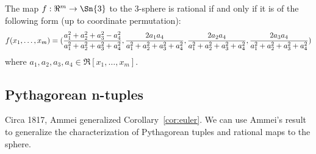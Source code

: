 \documentclass[11pt]{article}
\begin{document}
\begin{corollary}
\label{thm:map4}
The map $f: \Re^m \rightarrow \Sn{3}$ to the 3-sphere is rational if and only if
it is of the following form (up to coordinate permutation):
\begin{equation}
\label{eq:re4s3}
f(x_1,\ldots,x_m) = 
\footnotesize{(\frac{a_1^2 + a_2^2 + a_3^2 - a_4^2}{a_1^2 + a_2^2 + a_3^2 + a_4^2},
	 \frac{2a_1a_4}{a_1^2 + a_2^2 + a_3^2 + a_4^2},
	 \frac{2a_2a_4}{a_1^2 + a_2^2 + a_3^2 + a_4^2},
	 \frac{2a_3a_4}{a_1^2 + a_2^2 + a_3^2 + a_4^2})}
\end{equation}
where $a_1,a_2,a_3,a_4 \in \Re[x_1,\ldots,x_m]$.
\end{corollary}

\subsection{Pythagorean n-tuples}

Circa 1817, Ammei \cite{dickson52} %
generalized Corollary~\ref{cor:euler}.
We can use Ammei's result 
to generalize the characterization of Pythagorean tuples and rational maps to the sphere.
\end{document}
